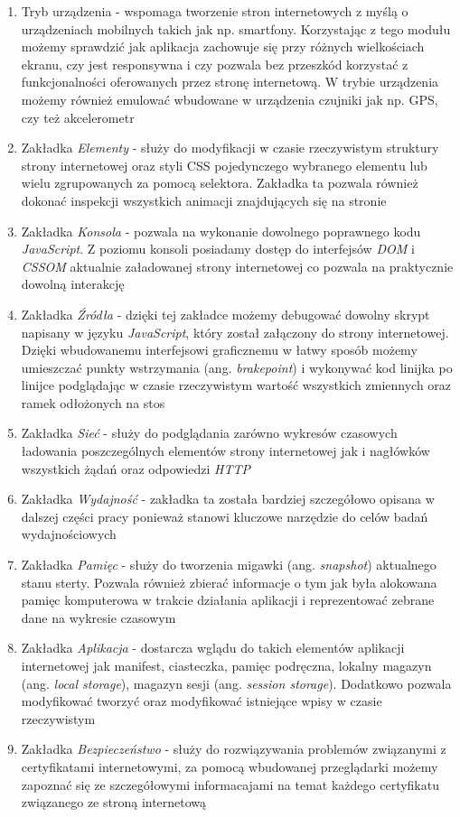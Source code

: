 \documentclass[polish, twoside, 12pt]{mwart}
\begin{document}
\begin{enumerate}
  \item Tryb urządzenia - wspomaga tworzenie stron internetowych z myślą o urządzeniach mobilnych takich jak np. smartfony. Korzystając z tego modułu możemy sprawdzić jak aplikacja zachowuje się przy różnych wielkościach ekranu, czy jest responsywna i czy pozwala bez przeszkód korzystać z funkcjonalności oferowanych przez stronę internetową. W trybie urządzenia możemy również emulować wbudowane w urządzenia czujniki jak np. GPS, czy też akcelerometr
  \item Zakładka \emph{Elementy} - służy do modyfikacji w czasie rzeczywistym struktury strony internetowej oraz styli CSS pojedynczego wybranego elementu lub wielu zgrupowanych za pomocą selektora. Zakładka ta pozwala również dokonać inspekcji wszystkich animacji znajdujących się na stronie
  \item Zakładka \emph{Konsola} - pozwala na wykonanie dowolnego poprawnego kodu \emph{JavaScript}. Z poziomu konsoli posiadamy dostęp do interfejsów \emph{DOM} i \emph{CSSOM} aktualnie załadowanej strony internetowej co pozwala na praktycznie dowolną interakcję
  \item Zakładka \emph{Źródła} - dzięki tej zakładce możemy debugować dowolny skrypt napisany w języku \emph{JavaScript}, który został załączony do strony internetowej. Dzięki wbudowanemu interfejsowi graficznemu w łatwy sposób możemy umieszczać punkty wstrzymania (ang. \emph{brakepoint}) i wykonywać kod linijka po linijce podglądając w czasie rzeczywistym wartość wszystkich zmiennych oraz ramek odłożonych na stos
  \item Zakładka \emph{Sieć} - służy do podglądania zarówno wykresów czasowych ładowania poszczególnych elementów strony internetowej jak i nagłówków wszystkich żądań oraz odpowiedzi \emph{HTTP}
  \item Zakładka \emph{Wydajność} - zakładka ta została bardziej szczegółowo opisana w dalszej części pracy ponieważ stanowi kluczowe narzędzie do celów badań wydajnościowych
  \item Zakładka \emph{Pamięc} - służy do tworzenia migawki (ang. \emph{snapshot}) aktualnego stanu sterty. Pozwala również zbierać informacje o tym jak była alokowana pamięc komputerowa w trakcie działania aplikacji i reprezentować zebrane dane na wykresie czasowym
  \item Zakładka \emph{Aplikacja} - dostarcza wglądu do takich elementów aplikacji internetowej jak manifest, ciasteczka, pamięc podręczna, lokalny magazyn (ang. \emph{local storage}), magazyn sesji (ang. \emph{session storage}). Dodatkowo pozwala modyfikować tworzyć oraz modyfikować istniejące wpisy w czasie rzeczywistym
  \item Zakładka \emph{Bezpieczeństwo} - służy do rozwiązywania problemów związanymi z certyfikatami internetowymi, za pomocą wbudowanej przeglądarki możemy zapoznać się ze szczegółowymi informacajami na temat każdego certyfikatu związanego ze stroną internetową
\end{enumerate}
\end{document}
